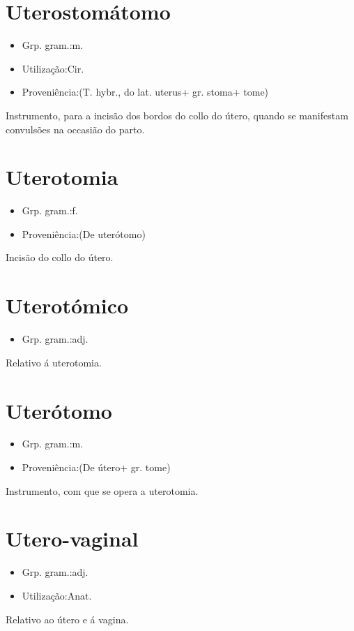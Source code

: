\documentclass{article}
\begin{document}
\section{Uterostomátomo}
\begin{itemize}
\item {Grp. gram.:m.}
\end{itemize}
\begin{itemize}
\item {Utilização:Cir.}
\end{itemize}
\begin{itemize}
\item {Proveniência:(T. hybr., do lat. \textunderscore uterus\textunderscore  + gr. \textunderscore stoma\textunderscore  + \textunderscore tome\textunderscore )}
\end{itemize}
Instrumento, para a incisão dos bordos do collo do útero, quando se manifestam convulsões na occasião do parto.
\section{Uterotomia}
\begin{itemize}
\item {Grp. gram.:f.}
\end{itemize}
\begin{itemize}
\item {Proveniência:(De \textunderscore uterótomo\textunderscore )}
\end{itemize}
Incisão do collo do útero.
\section{Uterotómico}
\begin{itemize}
\item {Grp. gram.:adj.}
\end{itemize}
Relativo á uterotomia.
\section{Uterótomo}
\begin{itemize}
\item {Grp. gram.:m.}
\end{itemize}
\begin{itemize}
\item {Proveniência:(De \textunderscore útero\textunderscore  + gr. \textunderscore tome\textunderscore )}
\end{itemize}
Instrumento, com que se opera a uterotomia.
\section{Utero-vaginal}
\begin{itemize}
\item {Grp. gram.:adj.}
\end{itemize}
\begin{itemize}
\item {Utilização:Anat.}
\end{itemize}
Relativo ao útero e á vagina.
\end{document}

